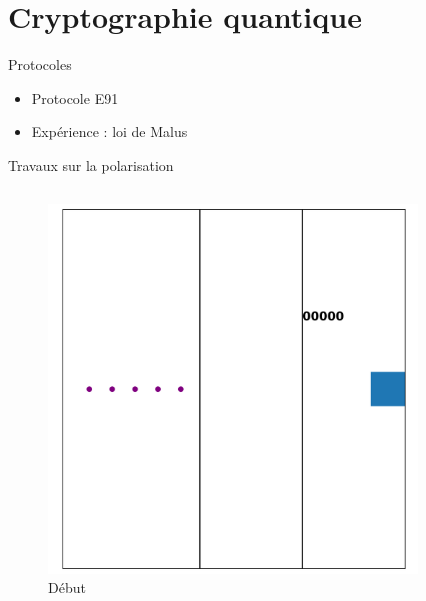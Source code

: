 \documentclass[french]{beamer}
\begin{document}
\section{Cryptographie quantique}

\begin{frame}{Protocoles}
    \begin{itemize}
        \item<1-> Protocole E91
        \item<2-> Expérience : loi de Malus
    \end{itemize}
\end{frame}

\begin{frame}{Travaux sur la polarisation}
    \begin{columns}
        \begin{column}{0.5\textwidth}
            \begin{figure}
                \captionsetup{labelformat=empty}
                \includegraphics[scale=0.05]{Debut.png}
                \caption{\small Début}
            \end{figure}
        \end{column}
        \begin{column}{0.5\textwidth}
            \begin{figure}
                \captionsetup{labelformat=empty}

\end{figure}
\end{column}
\end{columns}
\end{frame}
\end{document}
